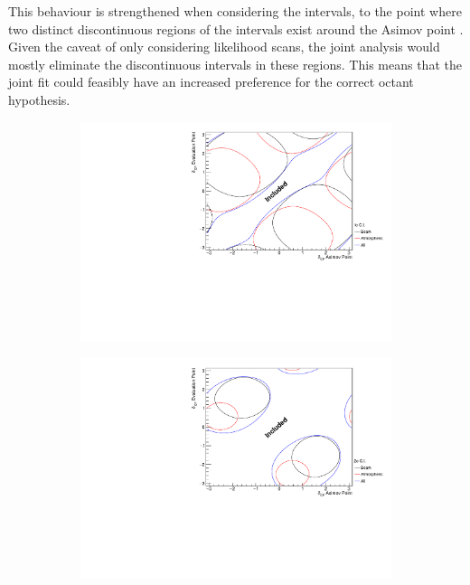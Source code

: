 This behaviour is strengthened when considering the \quickmath{2\sigma} intervals, to the point where two distinct discontinuous regions of the \quickmath{2\sigma} intervals exist around the Asimov point . Given the caveat of only considering likelihood scans, the joint analysis would mostly eliminate the discontinuous intervals in these regions. This means that the joint fit could feasibly have an increased preference for the correct octant hypothesis.

\begin{figure}[h]
  \begin{subfigure}[t]{1.0\textwidth}
    \includegraphics[width=\textwidth, trim={0mm 0mm 0mm 0mm}, clip,page=1]{Figures/OA/DCP_Scans_1Sig.pdf}
  \end{subfigure}
  \begin{subfigure}[t]{1.0\textwidth}
    \includegraphics[width=\textwidth, trim={0mm 0mm 0mm 0mm}, clip,page=1]{Figures/OA/DCP_Scans_2Sig.pdf}

\end{subfigure}
\end{figure}
